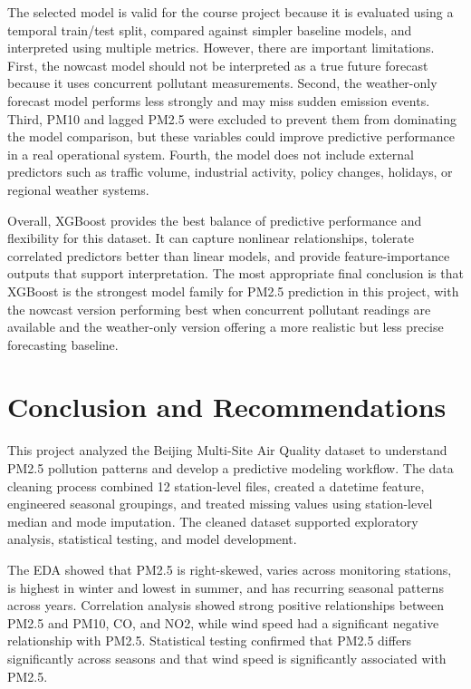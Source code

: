 \documentclass[stu,12pt,floatsintext]{apa7}
\begin{document}
The selected model is valid for the course project because it is evaluated using a
temporal train/test split, compared against simpler baseline models, and interpreted using
multiple metrics. However, there are important limitations. First, the nowcast model
should not be interpreted as a true future forecast because it uses concurrent pollutant
measurements. Second, the weather-only forecast model performs less strongly and may miss
sudden emission events. Third, PM10 and lagged PM2.5 were excluded to prevent them from
dominating the model comparison, but these variables could improve predictive performance
in a real operational system. Fourth, the model does not include external predictors such
as traffic volume, industrial activity, policy changes, holidays, or regional weather
systems.

Overall, XGBoost provides the best balance of predictive performance and flexibility for
this dataset. It can capture nonlinear relationships, tolerate correlated predictors
better than linear models, and provide feature-importance outputs that support
interpretation. The most appropriate final conclusion is that XGBoost is the strongest
model family for PM2.5 prediction in this project, with the nowcast version performing
best when concurrent pollutant readings are available and the weather-only version
offering a more realistic but less precise forecasting baseline.

\section{Conclusion and Recommendations}

This project analyzed the Beijing Multi-Site Air Quality dataset to understand PM2.5
pollution patterns and develop a predictive modeling workflow. The data cleaning process
combined 12 station-level files, created a datetime feature, engineered seasonal
groupings, and treated missing values using station-level median and mode imputation. The
cleaned dataset supported exploratory analysis, statistical testing, and model
development.

The EDA showed that PM2.5 is right-skewed, varies across monitoring stations, is highest
in winter and lowest in summer, and has recurring seasonal patterns across years.
Correlation analysis showed strong positive relationships between PM2.5 and PM10, CO, and
NO2, while wind speed had a significant negative relationship with PM2.5. Statistical
testing confirmed that PM2.5 differs significantly across seasons and that wind speed is
significantly associated with PM2.5.
\end{document}
